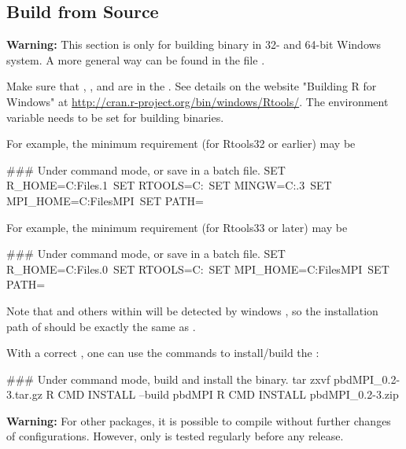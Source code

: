 \subsection[Build from Source]{Build from Source}
\label{sec:building_from_source}

{\color{red} \bf Warning:} This section is only for building binary in
32- and 64-bit Windows system. A more general way can be found in the file
.

Make sure that , , and  are in
the .
See details on the website "Building R for Windows" at
\url{http://cran.r-project.org/bin/windows/Rtools/}.
The environment variable 
needs to be set for building binaries.

For example, the minimum requirement (for Rtools32 or earlier) may be
\begin{Command}
### Under command mode, or save in a batch file.
SET R_HOME=C:\Program Files\R{}.1\
SET RTOOLS=C:\Rtools\bin\
SET MINGW=C:\Rtools{}.3\bin\
SET MPI_HOME=C:\Program Files\Miscrosoft MPI\
SET PATH=%
\end{Command}

For example, the minimum requirement (for Rtools33 or later) may be
\begin{Command}
### Under command mode, or save in a batch file.
SET R_HOME=C:\Program Files\R{}.0\
SET RTOOLS=C:\Rtools\bin\
SET MPI_HOME=C:\Program Files\Miscrosoft MPI\
SET PATH=%
\end{Command}
Note that  and others within  will be detected by
windows \proglang{R}, so the installation path of  should be
exactly the same as \code{C:/Rtools}.

With a correct \code{PATH}, one can use the  commands
to install/build the \pkg{pbdMPI}:
\begin{Command}
### Under command mode, build and install the binary.
tar zxvf pbdMPI_0.2-3.tar.gz
R CMD INSTALL --build pbdMPI
R CMD INSTALL pbdMPI_0.2-3.zip
\end{Command}

{\color{red} \bf Warning:} For other  packages, it is possible
to compile without further changes of configurations. However, only
\pkg{pbdMPI} is tested regularly before any release.

